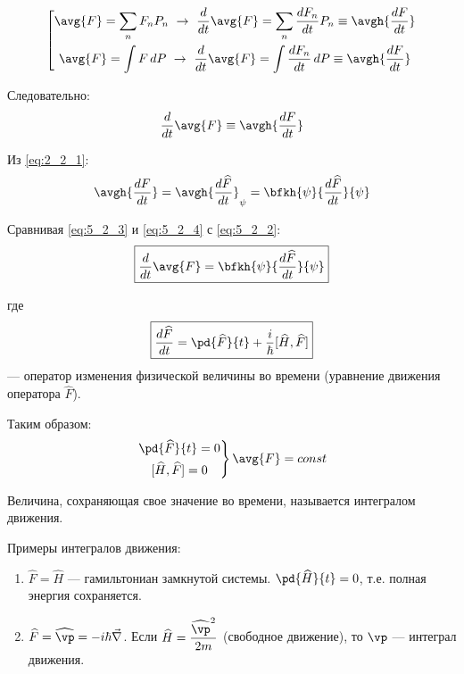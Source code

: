 $$
\left[
\begin{gathered}
\avg{F} = \sum_n F_n P_n ~\rightarrow~ \frac{d}{dt}\avg{F}=\sum_n \frac{dF_n}{dt}P_n \equiv \avgh{\frac{dF}{dt}}\\
\avg{F} = \int F\,dP ~\rightarrow~ \frac{d}{dt}\avg{F}=\int \frac{dF_n}{dt}\,dP \equiv \avgh{\frac{dF}{dt}}\\
\end{gathered}
\right.
$$

Следовательно:
\begin{equation}
\label{eq:5_2_3}
\frac{d}{dt} \avg{F} \equiv \avgh{\frac{dF}{dt}}
\end{equation}

Из \eqref{eq:2_2_1}:
\begin{equation}
\label{eq:5_2_4}
\avgh{\frac{dF}{dt}} = \avgh{\frac{d \widehat{F}}{dt}}_{\psi} = \bfkh{\psi}{\frac{d \widehat{F}}{dt}}{\psi}
\end{equation}

Сравнивая \eqref{eq:5_2_3} и \eqref{eq:5_2_4} с \eqref{eq:5_2_2}:
\begin{equation}
\label{eq:5_2_5}
\boxed{\frac{d}{dt} \avg{F} = \bfkh{\psi}{\frac{d \widehat{F}}{dt}}{\psi}}
\end{equation}

где
\begin{equation}
\label{eq:5_2_6}
\boxed{\frac{d\widehat{F}}{dt} = \pd{\widehat{F}}{t} + \frac{i}{\hbar} [\widehat{H}, \widehat{F}]}
\end{equation}
--- оператор изменения физической величины во времени (уравнение движения оператора $\widehat{F}$).

Таким образом:
$$
\left.
\begin{gathered}
\pd{\widehat{F}}{t}=0 \\
[\widehat{H}, \widehat{F}]=0
\end{gathered}
\right\} \avg{F}=const
$$

\begin{defn}
Величина, сохраняющая свое значение во времени, называется интегралом движения.
\end{defn}

Примеры интегралов движения:
\begin{enumerate}
\item $\widehat{F} = \widehat{H}$ --- гамильтониан замкнутой системы. $\pd{\widehat{H}}{t}=0$, т.е. полная энергия сохраняется.
\item $\widehat{F} = \widehat{\vp} = - i \hbar \vec{\nabla}$.  Если $\displaystyle\widehat{H} = \frac{\widehat{\vp}^2}{2m}$ (свободное движение), то $\vp$ --- интеграл движения.
\end{enumerate}

